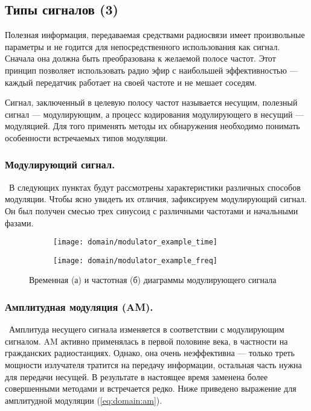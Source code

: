 \subsection{Типы сигналов (3)}

Полезная информация, передаваемая средствами радиосвязи имеет произвольные параметры и не годится для непосредственного использования как сигнал. Сначала она должна быть преобразована к желаемой полосе частот. Этот принцип позволяет использовать радио эфир с наибольшей эффективностью --- каждый передатчик работает на своей частоте и не мешает соседям.

Сигнал, заключенный в целевую полосу частот называется несущим, полезный сигнал --- модулирующим, а процесс кодирования модулирующего в несущий --- модуляцией. Для того применять методы их обнаружения необходимо понимать особенности встречаемых типов модуляции.


\subsubsection{Модулирующий сигнал.}\ В следующих пунктах будут рассмотрены характеристики различных способов модуляции. Чтобы ясно увидеть их отличия, зафиксируем модулирующий сигнал. Он был получен смесью трех синусоид с различными частотами и начальными фазами.

\begin{figure}[h]
  \centering
  \begin{subfigure}{0.45\textwidth}
    \texttt{[image: domain/modulator\_example\_time]}
    \caption{}
  \end{subfigure}
  \begin{subfigure}{0.45\textwidth}
    \texttt{[image: domain/modulator\_example\_freq]}
    \caption{}
  \end{subfigure}
  \caption{Временная (а) и частотная (б) диаграммы модулирующего сигнала}
  \label{fig:domain:modulator}
\end{figure}

\subsubsection{Амплитудная модуляция (AM).}\ Амплитуда несущего сигнала изменяется в соответствии с модулирующим сигналом. AM активно применялась в первой половине  века, в частности на гражданских радиостанциях. Однако, она очень неэффективна --- только треть мощности излучателя тратится на передачу информации, остальная часть нужна для передачи несущей. В результате в настоящее время заменена более совершенными методами и встречается редко. Ниже приведено выражение для амплитудной модуляции (\autoref{eq:domain:am}).

